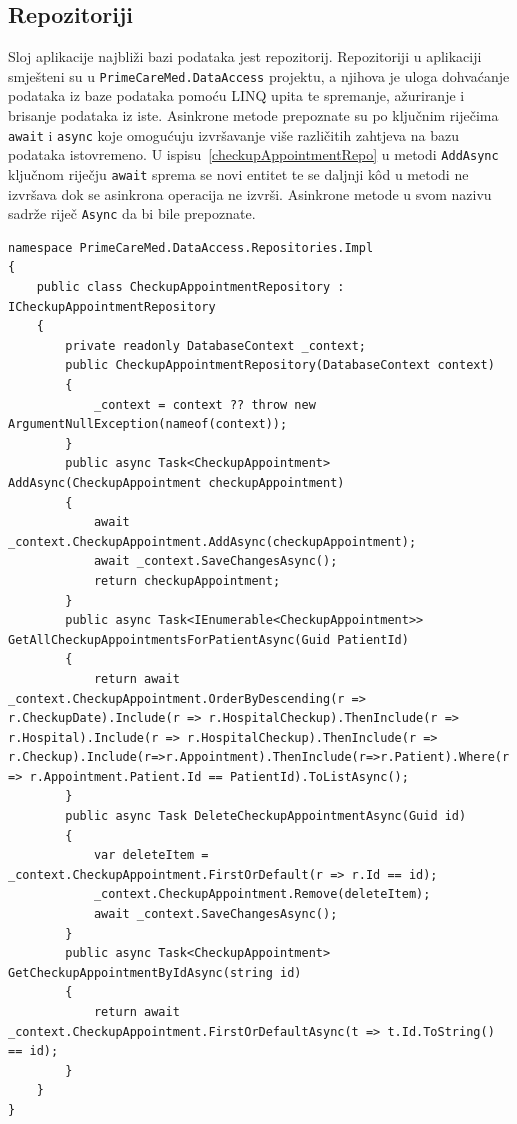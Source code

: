 \subsection{Repozitoriji}
\label{subsec:repo}
Sloj aplikacije najbliži bazi podataka jest repozitorij. Repozitoriji u aplikaciji smješteni su u \texttt{PrimeCareMed.DataAccess} projektu, a njihova je uloga dohvaćanje podataka iz baze podataka pomoću LINQ upita te spremanje, ažuriranje i brisanje podataka iz iste\cite{linq}. Asinkrone metode prepoznate su po ključnim riječima \texttt{await} i \texttt{async} koje omogućuju izvršavanje više različitih zahtjeva na bazu podataka istovremeno. U ispisu~\ref{checkupAppointmentRepo} u metodi \texttt{AddAsync} ključnom riječju \texttt{await} sprema se novi entitet te se daljnji k\^od u metodi ne izvršava dok se asinkrona operacija ne izvrši. Asinkrone metode u svom nazivu sadrže riječ \texttt{Async} da bi bile prepoznate.

\begin{lstlisting}[caption={\texttt{CheckupAppointment} repozitorij}, label=checkupAppointmentRepo]
namespace PrimeCareMed.DataAccess.Repositories.Impl
{
    public class CheckupAppointmentRepository : ICheckupAppointmentRepository
    {
        private readonly DatabaseContext _context;
        public CheckupAppointmentRepository(DatabaseContext context)
        {
            _context = context ?? throw new ArgumentNullException(nameof(context));
        }
        public async Task<CheckupAppointment> AddAsync(CheckupAppointment checkupAppointment)
        {
            await _context.CheckupAppointment.AddAsync(checkupAppointment);
            await _context.SaveChangesAsync();
            return checkupAppointment;
        }
        public async Task<IEnumerable<CheckupAppointment>> GetAllCheckupAppointmentsForPatientAsync(Guid PatientId)
        {
            return await _context.CheckupAppointment.OrderByDescending(r => r.CheckupDate).Include(r => r.HospitalCheckup).ThenInclude(r => r.Hospital).Include(r => r.HospitalCheckup).ThenInclude(r => r.Checkup).Include(r=>r.Appointment).ThenInclude(r=>r.Patient).Where(r => r.Appointment.Patient.Id == PatientId).ToListAsync();
        }
        public async Task DeleteCheckupAppointmentAsync(Guid id)
        {
            var deleteItem = _context.CheckupAppointment.FirstOrDefault(r => r.Id == id);
            _context.CheckupAppointment.Remove(deleteItem);
            await _context.SaveChangesAsync();
        }
        public async Task<CheckupAppointment> GetCheckupAppointmentByIdAsync(string id)
        {
            return await _context.CheckupAppointment.FirstOrDefaultAsync(t => t.Id.ToString() == id);
        }
    }
}
\end{lstlisting}

